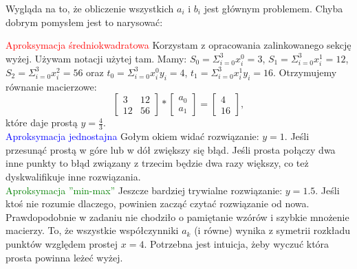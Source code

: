 \vspace{0.4cm}
\noindent Wygląda na to, że obliczenie wszystkich $a_i$ i $b_i$ jest głównym problemem. Chyba dobrym pomysłem jest to narysować:
\begin{center}
\end{center}
\textcolor{red}{Aproksymacja średniokwadratowa} Korzystam z opracowania zalinkowanego sekcję wyżej. Używam notacji użytej tam. Mamy:
$S_0=\Sigma^3_{i=0}x_i^0=3$, $S_1=\Sigma^3_{i=0}x_i^1=12$,$S_2=\Sigma^3_{i=0}x_i^2=56$ oraz $t_0=\Sigma^3_{i=0}x_i^0y_i=4$, $t_1=\Sigma^3_{i=0}x_i^1y_i=16$.
Otrzymujemy równanie macierzowe: 
\[ 
\left[ \begin{array}{cc}
3 & 12 \\
12 & 56 \end{array} \right]
 *
\left[ \begin{array}{cc}
a_0 \\
a_1 \end{array} \right]
=
\left[ \begin{array}{cc}
4 \\
16 \end{array} \right]
 ,\] które daje prostą $y=\frac{4}{3}$.\\
\textcolor{blue}{Aproksymacja jednostajna} Gołym okiem widać rozwiązanie: $y=1$. Jeśli przesunąć prostą w góre lub w dół zwiększy się błąd. Jeśli prosta połączy dwa inne punkty to błąd związany z trzecim będzie dwa razy większy, co też dyskwalifikuje inne rozwiązania. \\
\textcolor{green}{Aproksymacja ''min-max''} Jeszcze bardziej trywialne rozwiązanie: $y=1.5$. Jeśli ktoś nie rozumie dlaczego, powinien zacząć czytać rozwiązanie od nowa.\\

Prawdopodobnie w zadaniu nie chodziło o pamiętanie wzórów i szybkie mnożenie macierzy. To, że wszystkie współczynniki $a_k$ (i równe) wynika z symetrii rozkładu punktów względem prostej $x=4$. Potrzebna jest intuicja, żeby wyczuć która prosta powinna leżeć wyżej.


